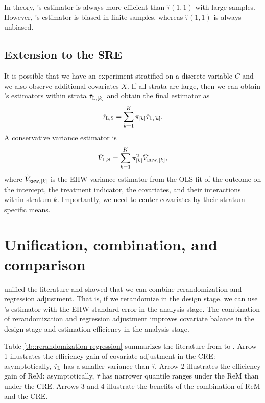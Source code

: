 In theory,  \citet{lin2013}'s estimator is always more efficient than $\hat{\tau}(1,1)$ with large samples. However, \citet{lin2013}'s estimator is biased in finite samples, whereas $\hat{\tau}(1,1)$ is always unbiased.   





\subsection{Extension to the SRE}\label{sec::covariate-SRE}


It is possible that we have an experiment stratified on a discrete variable $C$ and we also observe additional covariates $X$. If all strata are large, then we can obtain 
\citet{lin2013}'s estimators within strata $\hat{\tau}_{\textsc{L},[k]}$ and obtain the final estimator as
$$
\hat{\tau}_{\textsc{L},\textsc{S}} = \sum_{k=1}^K \pi_{[k]} \hat{\tau}_{\textsc{L},[k]} . 
$$
A conservative variance estimator is 
$$
\hat{V}_{\textsc{L},\textsc{S}} =  \sum_{k=1}^K \pi_{[k]}^2 \hat{V}_{\textsc{ehw},[k]},
$$
where $\hat{V}_{\textsc{ehw},[k]}$ is the EHW variance estimator from the OLS fit of the outcome on the intercept, the treatment indicator, the covariates, and their interactions within stratum $k.$ Importantly, we need to center covariates by their stratum-specific means.
 

\section{Unification, combination, and comparison}
\label{sec::unification-rem-regadj}


\citet{li2019rerandomization} unified the literature and showed that we can combine rerandomization and regression adjustment. That is, if we rerandomize in the design stage, we can use \citet{lin2013}'s estimator with the EHW standard error in the analysis stage. The combination of rerandomization and regression adjustment improves covariate balance in the design stage and estimation efficiency in the analysis stage. 




Table \ref{tb::rerandomization-regression} summarizes the literature from \citet{Neyman:1923} to \citet{li2019rerandomization}. Arrow 1 illustrates the efficiency gain of covariate adjustment in the CRE: asymptotically,  $\hat\tau_\textsc{L}$ has a smaller variance than $\hat\tau$. 
Arrow 2 illustrates the efficiency gain of ReM: asymptotically, $\hat{\tau}$ has narrower quantile ranges under the ReM than under the CRE.
Arrows 3 and 4 illustrate the benefits of the combination of ReM and the CRE.



